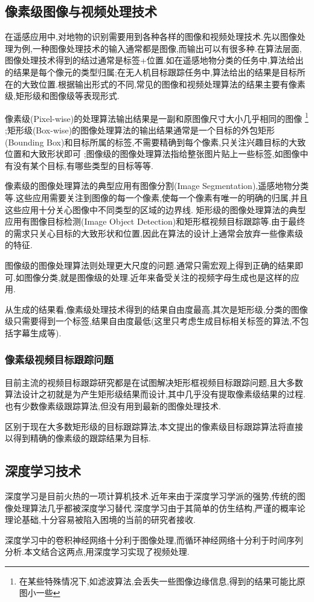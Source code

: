 \subsection{像素级图像与视频处理技术}
在遥感应用中,对地物的识别需要用到各种各样的图像和视频处理技术.先以图像处理为例,一种图像处理技术的输入通常都是图像,而输出可以有很多种.在算法层面,图像处理技术得到的结过通常是标签+位置.如在遥感地物分类的任务中,算法给出的结果是每个像元的类型归属;在无人机目标跟踪任务中,算法给出的结果是目标所在的大致位置.根据输出形式的不同,常见的图像和视频处理算法的结果主要有像素级,矩形级和图像级等表现形式.
\par
像素级(Pixel-wise)的处理算法输出结果是一副和原图像尺寸大小几乎相同的图像
\footnote{在某些特殊情况下,如滤波算法,会丢失一些图像边缘信息,得到的结果可能比原图小一些}
;矩形级(Box-wise)的图像处理算法的输出结果通常是一个目标的外包矩形(Bounding Box)和目标所属的标签,不需要精确到每个像素,只关注兴趣目标的大致位置和大致形状即可
;图像级的图像处理算法指给整张图片贴上一些标签,如图像中有没有某个目标,有哪些类型的目标等等.
\par
像素级的图像处理算法的典型应用有图像分割(Image Segmentation),遥感地物分类等.这些应用需要关注到图像的每一个像素,使每一个像素有唯一的明确的归属,并且这些应用十分关心图像中不同类型的区域的边界线.
矩形级的图像处理算法的典型应用有图像目标检测(Image Object Detection)和矩形框视频目标跟踪等.由于最终的需求只关心目标的大致形状和位置,因此在算法的设计上通常会放弃一些像素级的特征.
\par
图像级的图像处理算法则处理更大尺度的问题.通常只需宏观上得到正确的结果即可.如图像分类\supercite{imagenet_cvpr09},就是图像级的处理.近年来备受关注的视频字母生成\supercite{aswin2019nlp}也是这样的应用.

\par
从生成的结果看,像素级处理技术得到的结果自由度最高,其次是矩形级,分类的图像级只需要得到一个标签,结果自由度最低(这里只考虑生成目标相关标签的算法,不包括字幕生成等).

\subsubsection{像素级视频目标跟踪问题}
目前主流的视频目标跟踪研究都是在试图解决矩形框视频目标跟踪问题,且大多数算法设计之初就是为产生矩形级结果而设计,其中几乎没有提取像素级结果的过程.也有少数像素级跟踪算法,但没有用到最新的图像处理技术.
\par
区别于现在大多数矩形级的目标跟踪算法,本文提出的像素级目标跟踪算法将直接以得到精确的像素级的跟踪结果为目标.

\subsection{深度学习技术}
深度学习是目前火热的一项计算机技术.近年来由于深度学习学派的强势,传统的图像处理算法几乎都被深度学习替代.深度学习由于其简单的仿生结构,严谨的概率论理论基础,十分容易被陷入困境的当前的研究者接收.
\par
深度学习中的卷积神经网络十分利于图像处理,而循环神经网络十分利于时间序列分析.本文结合这两点,用深度学习实现了视频处理.

